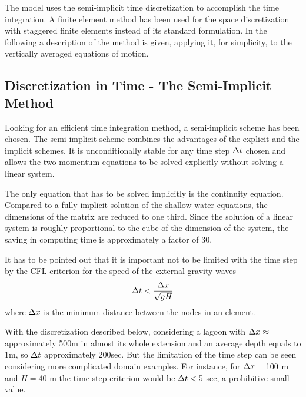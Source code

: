 The model uses the semi-implicit time discretization to accomplish
the time integration. A finite element method has been used for the space discretization
 with staggered finite elements instead of its standard formulation. 
In the following a description of the method is given, applying it, 
for simplicity, to the vertically averaged equations of motion.






\subsection{Discretization in Time - The Semi-Implicit Method}

Looking for an efficient time integration method,
a semi-implicit scheme has been chosen.
The semi-implicit scheme combines the advantages of
the explicit and the implicit schemes. It is unconditionally stable for any
time step $\mbox{$\Delta t$}$ chosen and allows the two momentum equations to be
solved explicitly without solving a linear system. 

The only equation
that has to be solved implicitly is the continuity equation. Compared
to a fully implicit solution of the shallow water equations, the dimensions
of the matrix are reduced to one third. Since the solution of a linear
system is roughly proportional to the cube of the dimension of the system,
the saving in computing time is approximately a factor of 30.

It has to be pointed out that it is important not to be limited with the time
step by the CFL criterion for the speed of the external gravity waves
\[
        \mbox{$\Delta t$} < \frac{\mbox{$\Delta x$}}{\sqrt{gH}}
\]
where $\mbox{$\Delta x$}$ is the minimum distance between the nodes in an element.

With the discretization described below, considering a lagoon with  $\mbox{$\Delta x$} \approx$ approximately 500m in almost its whole extension and an average depth equals to 1m, so $\mbox{$\Delta t$}$ approximately 200sec. But the limitation of the time step can be seen considering more complicated domain examples. For instance, 
for $\mbox{$\Delta x$} = 100$ m and $H = 40$ m
the time step criterion would be $\mbox{$\Delta t$} < 5$ sec, a
prohibitive small value.

